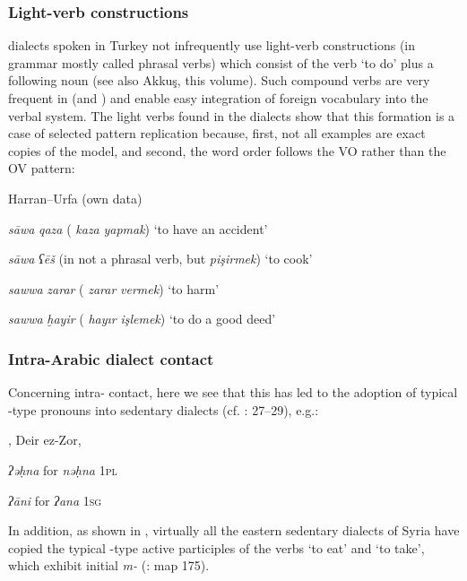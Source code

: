 \documentclass[output=paper]{langsci/langscibook}
\begin{document}
\subsubsection{Light-verb constructions}
 dialects spoken in Turkey not infrequently use light-verb constructions (in  grammar mostly called phrasal verbs) which consist of the verb ‘to do’ plus a following noun (see also Akkuş, this volume). Such compound verbs are very frequent in  (and ) and enable easy integration of foreign vocabulary into the verbal system. The {light verbs} found in the  dialects show that this {formation} is a case of selected pattern {replication} because, first, not all examples are exact copies of the  model, and second, the {word order} follows the  VO rather than the  OV pattern:

\ea
Harran--Urfa (own data)

\textit{sāwa} \textit{qaza} ( \textit{kaza} \textit{yapmak}) ‘to have an accident’

\textit{sāwa} \textit{ʕēš} (in  not a phrasal verb, but \textit{pişirmek}) ‘to cook’
\z

\ea
{}  \citep[198]{Procházka2002Cukurova} 

\textit{sawwa} \textit{zarar} ( \textit{zarar} \textit{vermek}) ‘to harm’

\textit{sawwa} \textit{ḫayir} ( \textit{hayır} \textit{işlemek}) ‘to do a good deed’
\z

\subsubsection{Intra-Arabic dialect contact}
Concerning intra- contact, here we see that this has led to the adoption of typical -type pronouns into sedentary dialects (cf. \citealt{Palva2009}: 27--29), e.g.:

\ea
{}, Deir ez-Zor,  

\textit{ʔəḥna} for \textit{nəḥna} \textsc{1pl}
\z

\ea
{} 

\textit{ʔāni} for \textit{ʔana} \textsc{1sg}
\z

In addition, as shown in , virtually all the eastern sedentary dialects of Syria have copied the typical -type active participles of the verbs ‘to eat’ and ‘to take’, which exhibit initial \textit{m-} (\citealt{Behnstedt1997}: map 175).
\end{document}

